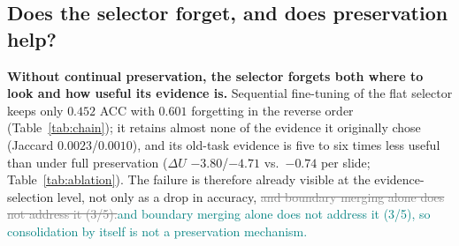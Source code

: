 \documentclass{article}
\newif\ifmarkup \markuptrue
\newcommand{\repc}[3]{\ifmarkup\textcolor{gray}{\sout{#2}}\textcolor{#1}{#3}\else#3\fi}
\newcommand{\repG}[2]{\repc{teal}{#1}{#2}}    %
\begin{document}
\subsection{Does the selector forget, and does preservation help?}
\label{ssec:ablation}

\begin{table}[!htb]
\centering\footnotesize\renewcommand{\arraystretch}{0.92}
\setlength{\tabcolsep}{4pt}
\caption{\textbf{Leave-out chain in both task orders} (TCGA continual WSI benchmark, ten-fold CV; ACC mean$\pm$sd, forgetting mean). Reverse = ESCA$\rightarrow$RCC$\rightarrow$BRCA$\rightarrow$LUNG; forward = the opposite. The zero-shot reference selects the eight patches with the highest class-text cosine, pools them uniformly, and uses the frozen head; it learns nothing. Last two rows: the strongest published method, as reported in \cite{gou2025qpmil} and as rerun by us with its released code.}
\label{tab:chain}
\end{table}

\textbf{Without continual preservation, the selector forgets both where to look and how useful its evidence is.} Sequential fine-tuning of the flat selector keeps only $0.452$ ACC with $0.601$ forgetting in the reverse order (Table~\ref{tab:chain}); it retains almost none of the evidence it originally chose (Jaccard $0.0023$/$0.0010$), and its old-task evidence is five to six times less useful than under full preservation ($\Delta U$ $-3.80$/$-4.71$ vs.\ $-0.74$ per slide; Table~\ref{tab:ablation}). The failure is therefore already visible at the evidence-selection level, not only as a drop in accuracy, \repG{and boundary merging alone does not address it (3/5).}{and boundary merging alone does not address it (3/5), so consolidation by itself is not a preservation mechanism.}
\end{document}
